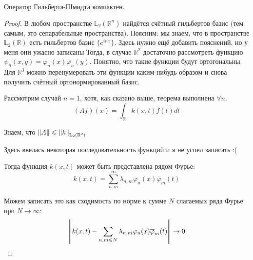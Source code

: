 \documentclass[12pt]{article}
\begin{document}
	\begin{state}
		Оператор Гильберта-Шмидта компактен.
	\end{state}
	\begin{proof}
		В любом пространстве $\mathbb{L}_2(\mathbb{R}^n)$ найдётся счётный гильбертов базис 
		(тем самым, это сепарабельные пространства).
		{\small
		Поясним: мы знаем, что в пространстве $\mathbb{L}_2(\mathbb{R})$ есть гильбертов базис $\{e^{inx}\}$.
		{\color{gray} Здесь нужно ещё добавить пояснений, но у меня они ужасно записаны}
		Тогда, в случае $\mathbb{R}^2$ достаточно рассмотреть функцию $\psi_n(x,y) = \varphi_n(x) \overline{\varphi_n}(y)$.
		Понятно, что такие функции будут ортогональны. Для $\mathbb{R}^3$ можно перенумеровать эти функции каким-нибудь образом
		и снова получить счётный ортонормированный базис.
		}
		
		Рассмотрим случай $n=1$, хотя, как сказано выше, теорема выполнена $\forall n$. 
		$$(Af)(x) = \int_{\mathbb{R}} k(x,t) f(t) dt$$
		
		Знаем, что $\left\| A \right\| \leqslant \left\| k \right\|_{\mathbb{L}_2(\mathbb{R}^2)}$
		
		{\color{gray} Здесь ввелась некоторая последовательность функций и я не успел записать :(}
		
		Тогда функция $k(x,t)$ может быть представлена рядом Фурье:
		$$k(x,t) = \sum_{n,m}^{\infty}\lambda_{n,m}\varphi_n(x)\overline{\varphi}_m(t)$$
		
		Можем записать это как сходимость по норме к сумме $N$ слагаемых ряда Фурье при $N \rightarrow \infty$:
		\begin{equation} \label{eq:partialFourierSum}
			\left\| k(x,t) - \sum_{n,m\leqslant N}\lambda_{n,m}\varphi_n(x)\overline{\varphi}_m(t) \right\| \rightarrow 0
		\end{equation}
	\end{proof}
\end{document}
